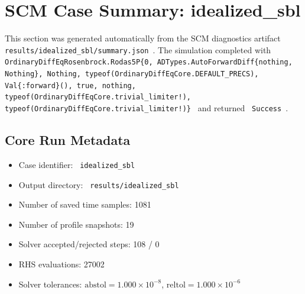 \section{SCM Case Summary: idealized\_sbl}
\label{sec:scm_case_idealized_sbl_idealized_sbl_80x2m_9h_report}

This section was generated automatically from the SCM diagnostics artifact
\texttt{ results/idealized\_sbl/summary.json }. The simulation completed with \texttt{ OrdinaryDiffEqRosenbrock.Rodas5P\{0, ADTypes.AutoForwardDiff\{nothing, Nothing\}, Nothing, typeof(OrdinaryDiffEqCore.DEFAULT\_PRECS), Val\{:forward\}(), true, nothing, typeof(OrdinaryDiffEqCore.trivial\_limiter!), typeof(OrdinaryDiffEqCore.trivial\_limiter!)\} }
and returned \texttt{ Success }.

\subsection{Core Run Metadata}
\begin{itemize}
  \item Case identifier: \texttt{ idealized\_sbl }
  \item Output directory: \texttt{ results/idealized\_sbl }
  \item Number of saved time samples: 1081
  \item Number of profile snapshots: 19
  \item Solver accepted/rejected steps: 108 / 0
  \item RHS evaluations: 27002
  \item Solver tolerances: $\mathrm{abstol}=1.000 \times 10^{-8}$, $\mathrm{reltol}=1.000 \times 10^{-6}$
\end{itemize}

